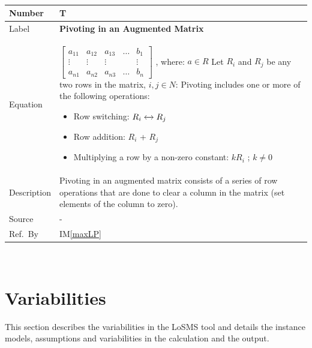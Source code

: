 \documentclass[12pt]{article}
\newcommand{\colAwidth}{0.13\textwidth}
\newcommand{\colBwidth}{0.82\textwidth}
\newcounter{theorynum} %
\newcommand{\iref}[1]{IM\ref{#1}}
\newcommand{\famname}{LoSMS} %
\begin{document}
~\newline

\noindent
\begin{minipage}{\textwidth}
	\renewcommand*{\arraystretch}{1.5}
	\begin{tabular}{| p{\colAwidth} | p{\colBwidth}|}
		\hline
		\rowcolor[gray]{0.9}
		Number& T{theorynum}\thetheorynum \label{T_pivoting}\\
		\hline
		Label&\bf Pivoting in an Augmented Matrix\\
		\hline
		Equation&$\begin{bmatrix}
		a_{11} & a_{12} & a_{13} & \dots & b_{1}\\
		\vdots & \vdots & \vdots & &\vdots\\
		a_{n1} & a_{n2} & a_{n3} & \dots & b_{n}	
		\end{bmatrix}$ , where: $a \in R$ \newline \newline
		Let $R_i$ and $R_j$ be any two rows in the matrix, $i, j \in N$: 
		\newline
		Pivoting includes one or more of the following operations:
		\begin{itemize}
			\item Row switching: $R_i \xleftrightarrow{} R_j$
			
			\item Row addition: $R_i$ + $R_j$
			
			\item Multiplying a row by a non-zero constant: $kR_i$ ; 
			$k \neq 0$
		\end{itemize} \\
		\hline
		Description & 
		Pivoting in an augmented matrix consists of a series of row operations 
		that are done to clear a column in the matrix (set elements of the 
		column to zero).\\
		\hline
		Source & -\\
		\hline
		Ref.\ By & \iref{maxLP}\\
		\hline
	\end{tabular}
\end{minipage}\\

\section{Variabilities} \label{Sec_Variabilities} 

This section describes the variabilities in the \famname{} tool and details the 
instance models, assumptions and variabilities in the calculation and the 
output.
\end{document}
